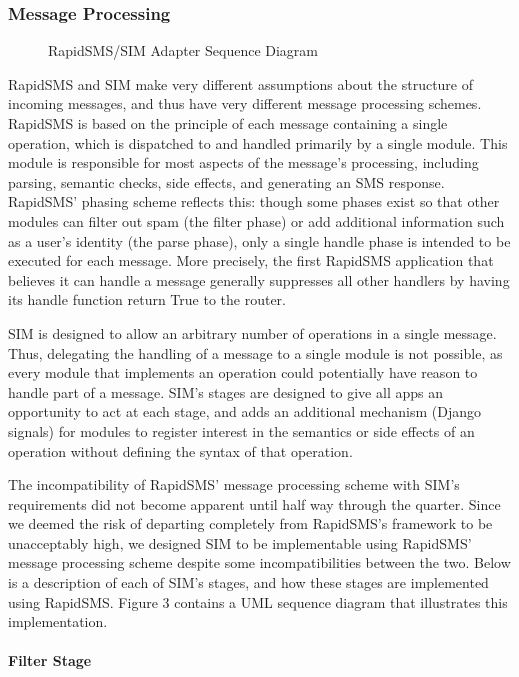 \documentclass{acm_proc_article-sp}
\begin{document}
\subsubsection{Message Processing}

\begin{figure*}
\centering
{}
\caption{RapidSMS/SIM Adapter Sequence Diagram}
\end{figure*}

RapidSMS and SIM make very different assumptions about the structure of incoming messages, and thus have very different message processing schemes. RapidSMS is based on the principle of each message containing a single operation, which is dispatched to and handled primarily by a single module. This module is responsible for most aspects of the message's processing, including parsing, semantic checks, side effects, and generating an SMS response. RapidSMS' phasing scheme reflects this: though some phases exist so that other modules can filter out spam (the filter phase) or add additional information such as a user's identity (the parse phase), only a single handle phase is intended to be executed for each message. More precisely, the first RapidSMS application that believes it can handle a message generally suppresses all other handlers by having its handle function return True to the router.

SIM is designed to allow an arbitrary number of operations in a single message. Thus, delegating the handling of a message to a single module is not possible, as every module that implements an operation could potentially have reason to handle part of a message. SIM's stages are designed to give all apps an opportunity to act at each stage, and adds an additional mechanism (Django signals) for modules to register interest in the semantics or side effects of an operation without defining the syntax of that operation.

The incompatibility of RapidSMS' message processing scheme with SIM's requirements did not become apparent until half way through the quarter. Since we deemed the risk of departing completely from RapidSMS's framework to be unacceptably high, we designed SIM to be implementable using RapidSMS' message processing scheme despite some incompatibilities between the two. Below is a description of each of SIM's stages, and how these stages are implemented using RapidSMS. Figure 3 contains a UML sequence diagram that illustrates this implementation.

\paragraph{Filter Stage}
\end{document}
